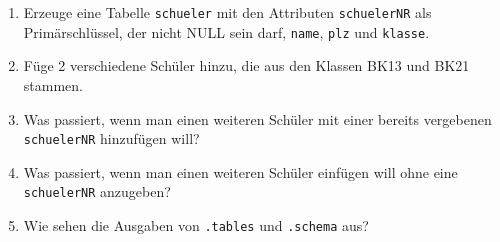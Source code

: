 \begin{Exercise}[title={Beantworte folgende Fragen mit Hilfe deiner Datenbank.}, label=Befuellen]
	\begin{enumerate}
		\item Erzeuge eine Tabelle \lstinline!schueler! mit den Attributen \lstinline!schuelerNR! als Primärschlüssel, der nicht NULL sein darf, \lstinline!name!, \lstinline!plz! und \lstinline!klasse!.
		\item Füge 2 verschiedene Schüler hinzu, die aus den Klassen BK13 und BK21 stammen.
		\item Was passiert, wenn man einen weiteren Schüler mit einer bereits vergebenen \lstinline!schuelerNR! hinzufügen will?
		\item Was passiert, wenn man einen weiteren Schüler einfügen will ohne eine \lstinline!schuelerNR! anzugeben?
		\item Wie sehen die Ausgaben von \lstinline!.tables! und \lstinline!.schema! aus?
	\end{enumerate}
\end{Exercise}
